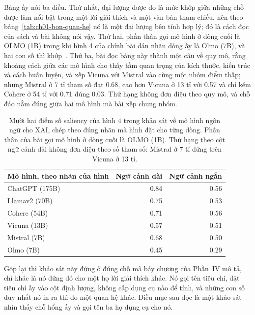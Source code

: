 Bảng ấy nói ba điều. Thứ nhất, đại lượng được đo là mức khớp giữa những chỗ được
làm nổi bật trong một lời giải thích và một văn bản tham chiếu, nên theo
bảng~\ref{tab:ch01-bon-quan-he} nó là một đại lượng bên tính hợp lý; đó là cách
đọc của sách và bài không nói vậy. Thứ hai, phần thân gọi mô hình ở dòng cuối là
OLMO (1B) trong khi hình 4 của chính bài dán nhãn dòng ấy là Olmo (7B), và hai
con số thì khớp~\autocite{p16llmxai}. Thứ ba, bài đọc bảng này thành một câu về
quy mô, rằng khoảng cách giữa các mô hình cho thấy tầm quan trọng của kích thước,
kiến trúc và cách huấn luyện, và xếp Vicuna với Mistral vào cùng một nhóm điểm
thấp; nhưng Mistral ở 7 tỉ tham số đạt 0.68, cao hơn Vicuna ở 13 tỉ với 0.57 và
chỉ kém Cohere ở 54 tỉ với 0.71 đúng 0.03. Thứ hạng không đơn điệu theo quy mô,
và chỗ đảo nằm đúng giữa hai mô hình mà bài xếp chung nhóm.

\begin{table}[htbp]
  \centering
  \caption{Mười hai điểm số saliency của hình 4 trong khảo sát về mô hình ngôn
  ngữ cho XAI, chép theo đúng nhãn mà hình đặt cho từng dòng. Phần thân của bài
  gọi mô hình ở dòng cuối là OLMO (1B). Thứ hạng theo cột ngữ cảnh dài không đơn
  điệu theo số tham số: Mistral ở 7 tỉ đứng trên Vicuna ở 13 tỉ.}
  \label{tab:ch17-saliency}
  \begin{tabular}{@{}lrr@{}}
    \toprule
    Mô hình, theo nhãn của hình & Ngữ cảnh dài & Ngữ cảnh ngắn \\
    \midrule
    ChatGPT (175B)  & 0.84 & 0.56 \\
    Llamav2 (70B)   & 0.75 & 0.53 \\
    Cohere (54B)    & 0.71 & 0.56 \\
    Vicuna (13B)    & 0.57 & 0.51 \\
    Mistral (7B)    & 0.68 & 0.50 \\
    Olmo (7B)       & 0.45 & 0.29 \\
    \bottomrule
  \end{tabular}
\end{table}

%
Gộp lại thì khảo sát này đứng ở đúng chỗ mà bảy chương của Phần~IV mô tả, chỉ
khác là nó đứng đó cho một họ lời giải thích khác. Nó gọi tên tiêu chí, đặt tiêu
chí ấy vào cột định lượng, không cấp dụng cụ nào để tính, và những con số duy
nhất nó in ra thì đo một quan hệ khác. Điều mục sau đọc là một khảo sát nhìn thấy
chỗ hổng ấy và gọi tên ba họ dụng cụ cho nó.
